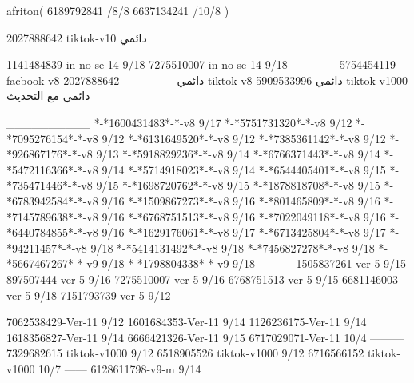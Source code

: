 afriton(
6189792841 /8/8
6637134241 /10/8
)

2027888642 tiktok-v10
دائمي



1141484839-in-no-se-14 9/18
7275510007-in-no-se-14 9/18
------------
5754454119 facbook-v8
دائمي
--------------
2027888642 tiktok-v8
دائمي
5909533996 tiktok-v1000
دائمي مع التحديث

__________
*-*1600431483*-*-v8 9/17
*-*5751731320*-*-v8 9/12
*-*7095276154*-*-v8 9/12
*-*6131649520*-*-v8 9/12
*-*7385361142*-*-v8 9/12
*-*926867176*-*-v8 9/13
*-*5918829236*-*-v8 9/14
*-*6766371443*-*-v8 9/14
*-*5472116366*-*-v8 9/14
*-*5714918023*-*-v8 9/14
*-*6544405401*-*-v8 9/15
*-*735471446*-*-v8 9/15
*-*1698720762*-*-v8 9/15
*-*1878818708*-*-v8 9/15
*-*6783942584*-*-v8 9/16
*-*1509867273*-*-v8 9/16
*-*801465809*-*-v8 9/16
*-*7145789638*-*-v8 9/16
*-*6768751513*-*-v8 9/16
*-*7022049118*-*-v8 9/16
*-*6440784855*-*-v8 9/16
*-*1629176061*-*-v8 9/17
*-*6713425804*-*-v8 9/17
*-*94211457*-*-v8 9/18
*-*5414131492*-*-v8 9/18
*-*7456827278*-*-v8 9/18
*-*5667467267*-*-v9 9/18
*-*1798804338*-*-v9 9/18
---------
1505837261-ver-5 9/15
897507444-ver-5 9/16
7275510007-ver-5 9/16
6768751513-ver-5 9/15
6681146003-ver-5 9/18
7151793739-ver-5 9/12
------------



7062538429-Ver-11
9/12
1601684353-Ver-11
9/14
1126236175-Ver-11
9/14
1618356827-Ver-11
9/14
6666421326-Ver-11
9/15
6717029071-Ver-11
10/4
---------
7329682615 tiktok-v1000
9/12
6518905526 tiktok-v1000
9/12
6716566152 tiktok-v1000
10/7
------
6128611798-v9-m
9/14
